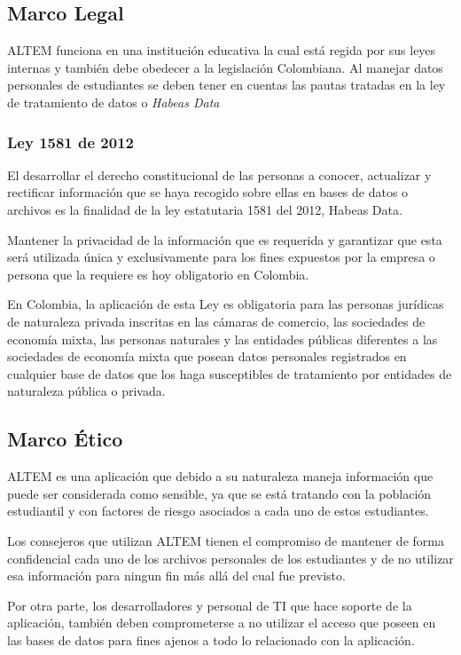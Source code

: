\subsection{Marco Legal}
ALTEM funciona en una institución educativa la cual está regida por sus leyes internas y también debe obedecer a la legislación Colombiana. Al manejar datos personales de estudiantes se deben tener en cuentas las pautas tratadas en la ley de tratamiento de datos o \textit{Habeas Data}

\subsubsection{ Ley 1581 de 2012 }
El desarrollar el derecho constitucional de las personas a conocer, actualizar y rectificar información que se haya recogido sobre ellas en bases de datos o archivos es la finalidad de la ley estatutaria 1581 del 2012, Habeas Data.\cite{hadata}

Mantener la privacidad de la información que es requerida y garantizar que esta será utilizada única y exclusivamente para los fines expuestos por la empresa o persona que la requiere es hoy obligatorio en Colombia.\cite{hadata}

En Colombia, la aplicación de esta Ley es obligatoria para las personas jurídicas de naturaleza privada inscritas en las cámaras de comercio, las sociedades de economía mixta, las personas naturales y las entidades públicas diferentes a las sociedades de economía mixta que posean datos personales registrados en cualquier base de datos que los haga susceptibles de tratamiento por entidades de naturaleza pública o privada.\cite{hadata}

\subsection{Marco Ético}
ALTEM es una aplicación que debido a su naturaleza maneja información que puede ser considerada como sensible, ya que se está tratando con la población estudiantil y con factores de riesgo asociados a cada uno de estos estudiantes. 

Los consejeros que utilizan ALTEM tienen el compromiso de mantener de forma confidencial cada uno de los archivos personales de los estudiantes y de no utilizar esa información para ningun fin más allá del cual fue previsto.

Por otra parte, los desarrolladores y personal de TI que hace soporte de la aplicación, también deben comprometerse a no utilizar el acceso que poseen en las bases de datos para fines ajenos a todo lo relacionado con la aplicación.

